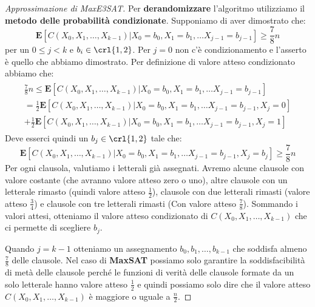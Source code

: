 \documentclass[\main/main.tex]{subfiles}
\begin{document}
\begin{proof}[Approssimazione di MaxE3SAT]
    Per \textbf{derandomizzare} l'algoritmo utilizziamo il \textbf{metodo delle probabilità condizionate}. Supponiamo di aver dimostrato che:
    \[
        \mathbf{E}\left[C\left(X_{0}, X_{1}, \ldots, X_{k-1}\right) | X_{0}=b_{0}, X_{1}=b_{1}, \ldots X_{j-1}=b_{j-1}\right] \geq \frac{7}{8} n
    \]
    per un \(0 \leq j < k\) e \(b_i \in \crl{1,2}\). Per \(j=0\) non c'è condizionamento e l'asserto è quello che abbiamo dimostrato. Per definizione di valore atteso condizionato abbiamo che:
    \begin{align*}
        \begin{array}{c}
            {\frac{7}{8} n \leq \mathbf{E}\left[C\left(X_{0}, X_{1}, \ldots, X_{k-1}\right) | X_{0}=b_{0}, X_{1}=b_{1}, \ldots X_{j-1}=b_{j-1}\right]}\\
            {=\frac{1}{2} \mathbf{E}\left[C\left(X_{0}, X_{1}, \ldots, X_{k-1}\right) | X_{0}=b_{0}, X_{1}=b_{1}, \ldots X_{j-1}=b_{j-1}, X_{j}=0\right]}\\
            {+\frac{1}{2} \mathbf{E}\left[C\left(X_{0}, X_{1}, \ldots, X_{k-1}\right) | X_{0}=b_{0}, X_{1}=b_{1}, \ldots X_{j-1}=b_{j-1}, X_{j}=1\right]}
        \end{array}
    \end{align*}
    Deve esserci quindi un \(b_j \in \crl{1,2}\) tale che:
    \[
        \mathbf{E}\left[C\left(X_{0}, X_{1}, \ldots, X_{k-1}\right) | X_{0}=b_{0}, X_{1}=b_{1}, \ldots X_{j-1}=b_{j-1}, X_{j}=b_{j}\right] \geq \frac{7}{8} n
    \]
    Per ogni clausola, valutiamo i letterali già assegnati. Avremo alcune clausole con valore costante (che avranno valore atteso zero o uno), altre clausole con un letterale rimasto (quindi valore atteso \(\frac{1}{2}\)), clausole con due letterali rimasti (valore atteso \(\frac{3}{4}\)) e clausole con tre letterali rimasti (Con valore atteso \(\frac{7}{8}\)). Sommando i valori attesi, otteniamo il valore atteso condizionato di \(C\left(X_{0}, X_{1}, \ldots, X_{k-1}\right)\) che ci permette di scegliere \(b_j\). 
    
    Quando \(j=k-1\) otteniamo un assegnamento \(b_0, b_1, \ldots, b_{k-1}\) che soddisfa almeno \(\frac{7}{8}\) delle clausole. Nel caso di \textbf{MaxSAT} possiamo solo garantire la soddisfacibilità di metà delle clausole perché le funzioni di verità delle clausole formate da un solo letterale hanno valore atteso \(\frac{1}{2}\) e quindi possiamo solo dire che il valore atteso \(C\left(X_{0}, X_{1}, \ldots, X_{k-1}\right)\) è maggiore o uguale a \(\frac{n}{2}\).
\end{proof}
\clearpage
\end{document}
